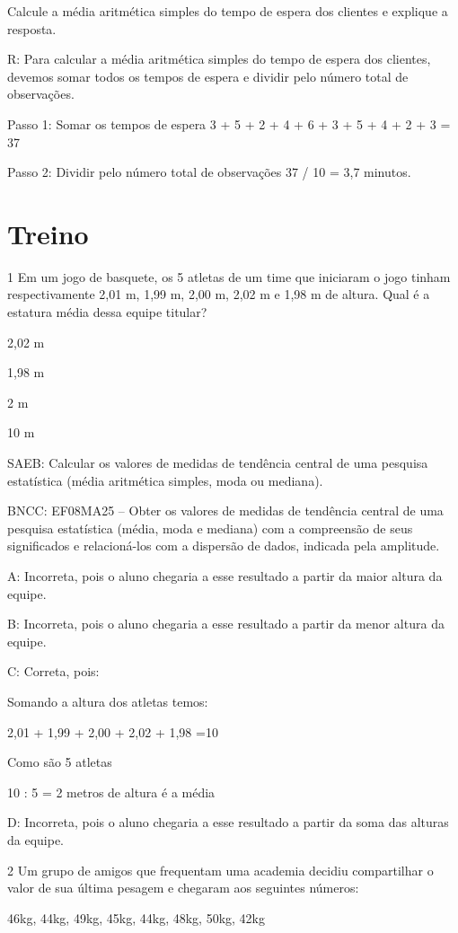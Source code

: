 {Calcule a média aritmética simples do tempo de espera dos clientes e
explique a resposta.

R: Para calcular a média aritmética simples do tempo de espera dos
clientes, devemos somar todos os tempos de espera e dividir pelo número
total de observações.

Passo 1: Somar os tempos de espera 3 + 5 + 2 + 4 + 6 + 3 + 5 + 4 + 2 + 3
= 37

Passo 2: Dividir pelo número total de observações 37 / 10 = 3,7 minutos.

\section{Treino}

\num{1} Em um jogo de basquete, os 5 atletas de um time que iniciaram o jogo
tinham respectivamente 2,01 m, 1,99 m, 2,00 m, 2,02 m e 1,98 m de
altura. Qual é a estatura média dessa equipe titular?
\item 2,02 m
\item 1,98 m
\item 2 m
\item 10 m

SAEB: Calcular os valores de medidas de tendência central de uma
pesquisa estatística (média aritmética simples, moda ou mediana).

BNCC: EF08MA25 -- Obter os valores de medidas de tendência central de
uma pesquisa estatística (média, moda e mediana) com a compreensão de
seus significados e relacioná-los com a dispersão de dados, indicada
pela amplitude.

A: Incorreta, pois o aluno chegaria a esse resultado a partir da maior
altura da equipe.

B: Incorreta, pois o aluno chegaria a esse resultado a partir da menor
altura da equipe.

C: Correta, pois:

Somando a altura dos atletas temos:

2,01 + 1,99 + 2,00 + 2,02 + 1,98 =10

Como são 5 atletas

10 : 5 = 2 metros de altura é a média

D: Incorreta, pois o aluno chegaria a esse resultado a partir da soma
das alturas da equipe.

\num{2} Um grupo de amigos que frequentam uma academia decidiu compartilhar o
valor de sua última pesagem e chegaram aos seguintes números:

46kg, 44kg, 49kg, 45kg, 44kg, 48kg, 50kg, 42kg

}
